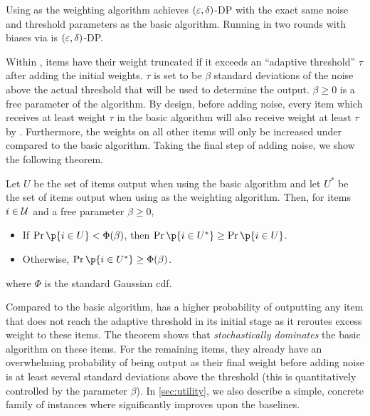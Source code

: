 \begin{theorem}
Using \ouralgo{} as the weighting algorithm achieves $(\varepsilon, \delta)$-DP with the exact same noise and threshold parameters as the basic algorithm.
Running \ouralgo{} in two rounds with biases via \ouralgotworounds{} is $(\varepsilon, \delta)$-DP.
\end{theorem}

Within \ouralgo{}, items have their weight truncated if it exceeds an ``adaptive threshold'' $\tau$ after adding the initial weights. $\tau$ is set to be $\beta$ standard deviations of the noise above the actual threshold that will be used to determine the output. $\beta \geq 0$ is a free parameter of the algorithm. By design, before adding noise, every item which receives at least weight $\tau$ in the basic algorithm will also receive weight at least $\tau$ by \ouralgo{}. Furthermore, the weights on all other items will only be increased under \ouralgo{} compared to the basic algorithm. Taking the final step of adding noise, we show the following theorem.

\begin{theorem}\label{thm:maxalgo-perf-informal}
Let $U$ be the set of items output when using the basic algorithm and let $U^*$ be the set of items output when using \ouralgo{} as the weighting algorithm.
Then, for items $i \in \mathcal{U}$ and a free parameter $\beta \geq 0$,
\begin{itemize}
    \item If $\Pr\p{i \in U} < \Phi(\beta)$, then $\Pr\p{i \in U^*} \geq \Pr\p{i \in U}$.
    \item Otherwise, $\Pr\p{i \in U^*} \geq \Phi(\beta)$.
\end{itemize}
where $\Phi$ is the standard Gaussian cdf.
\end{theorem}

Compared to the basic algorithm, \ouralgo{} has a higher probability of outputting any item that does not reach the adaptive threshold in its initial stage as it reroutes excess weight to these items.
The theorem shows that \ouralgo{} \emph{stochastically dominates} the basic algorithm on these items.
For the remaining items, they already have an overwhelming probability of being output as their final weight before adding noise is at least several standard deviations above the threshold (this is quantitatively controlled by the parameter $\beta$).
In \cref{sec:utility}, we also describe a simple, concrete family of instances where \ouralgo{} significantly improves upon the baselines.


